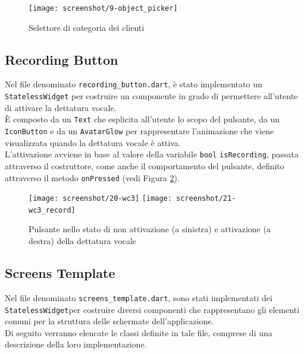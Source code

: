 \begin{figure}[!h] 
    \centering 
    \texttt{[image: screenshot/9-object\_picker]}
    \caption{Selettore di categoria dei clienti}
    \label{fig:object-picker}
\end{figure}

\subsection{Recording Button}
\label{subsec:recording-button}

Nel file denominato \lstinline{recording_button.dart}, è stato implementato un \lstinline{StatelessWidget} per costruire un componente in grado di permettere all'utente di attivare la dettatura vocale.\\
È composto da un \lstinline{Text} \cite{site:text} che esplicita all'utente lo scopo del pulsante, da un \lstinline{IconButton} \cite{site:icon-button} e da un \lstinline{AvatarGlow} \cite{site:avatar-glow} per rappresentare l'animazione che viene visualizzata quando la dettatura vocale è attiva.\\
L'attivazione avviene in base al valore della variabile \lstinline{bool} \lstinline{isRecording}, passata attraverso il costruttore, come anche il comportamento del pulsante, definito attraverso il metodo \lstinline{onPressed} \cite{site:on-pressed} (vedi Figura \ref{fig:record-button}).

\begin{figure}[!h] 
    \centering 
    \texttt{[image: screenshot/20-wc3]}
    \hfill
    \texttt{[image: screenshot/21-wc3\_record]} 
    \caption{Pulsante nello stato di non attivazione (a sinistra) e attivazione (a destra) della dettatura vocale}
    \label{fig:record-button}
\end{figure}

\newpage

\subsection{Screens Template}
\label{subsec:screens-template}

Nel file denominato \lstinline{screens_template.dart}, sono stati implementati dei \lstinline{StatelessWidget}per costruire diversi componenti che rappresentano gli elementi comuni per la struttura delle schermate dell'applicazione.\\
Di seguito verranno elencate le classi definite in tale file, comprese di una descrizione della loro implementazione.


